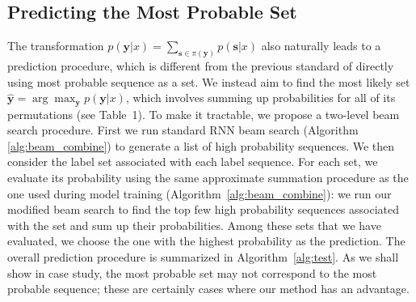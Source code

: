 \subsection{Predicting the Most Probable Set}
The transformation $p(\mathbf{y}|x)=\sum_{\mathbf{s}\in \pi(\mathbf{y})} p(\mathbf{s}|x)$ also naturally leads to a prediction procedure, which is different from the previous standard of directly using most probable sequence as a set. We instead aim to find the most likely set $\hat{\mathbf{y}}=\arg\max_{\mathbf{y}} p(\mathbf{y}|x)$, which involves summing up probabilities for all of its permutations (see Table~1). To make it tractable, we propose a two-level beam search procedure. First we run standard RNN beam search (Algorithm \ref{alg:beam_combine}) to generate a list of high probability sequences.  We then consider the label set associated with each label sequence.  For each set, we evaluate its probability using the same approximate summation procedure as the one used during model training (Algorithm~\ref{alg:beam_combine}): we run our modified beam search to find the top few high probability sequences associated with the set and sum up their probabilities. Among these sets that we have evaluated, we choose the one with the highest probability as the prediction. The overall prediction procedure is summarized in Algorithm~\ref{alg:test}. As we shall show in case study, the most probable set may not correspond to the most probable sequence; these are certainly cases where our method has an advantage.


